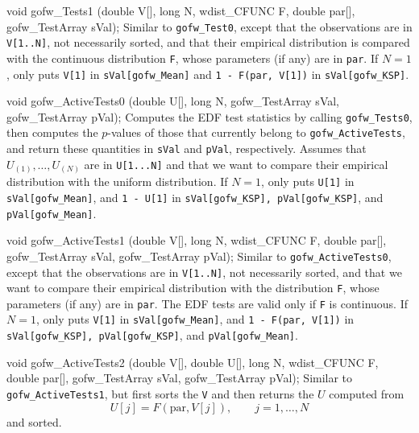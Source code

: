 void gofw_Tests1 (double V[], long N, wdist_CFUNC F, double par[],
                  gofw_TestArray sVal);
\endcode
\tab  Similar to {\tt gofw\_Test0}, except that 
 the observations are in {\tt V[1..N]},
 not necessarily sorted, and that their empirical
 distribution is compared with the continuous distribution {\tt F},
 whose parameters (if any) are in {\tt par}. 
 If $N = 1$, only puts {\tt V[1]} in {\tt sVal[gofw\_Mean]}
 and {\tt 1 - F(par, V[1])} in {\tt sVal[gofw\_KSP]}.
\endtab
\code


void gofw_ActiveTests0 (double U[], long N, 
                        gofw_TestArray sVal, gofw_TestArray pVal);
\endcode
\tab  Computes the EDF test statistics by calling 
  {\tt gofw\_Tests0}, then computes the $p$-values of those
  that currently belong to {\tt gofw\_ActiveTests},
  and return these quantities in {\tt sVal} and {\tt pVal}, respectively.
  Assumes that $U_{(1)},\dots,U_{(N)}$ are in {\tt U[1...N]}
  and that we want to compare their empirical distribution
  with the uniform distribution.
  If $N = 1$, only puts {\tt U[1]} in {\tt sVal[gofw\_Mean]},
  and {\tt 1 - U[1]} in {\tt sVal[gofw\_KSP], pVal[gofw\_KSP]}, and
  {\tt pVal[gofw\_Mean]}.
\endtab
\code


void gofw_ActiveTests1 (double V[], long N, wdist_CFUNC F, double par[],
                        gofw_TestArray sVal, gofw_TestArray pVal);
\endcode
\tab Similar to {\tt gofw\_ActiveTests0},
 except that the observations are in {\tt V[1..N]},
 not necessarily sorted, and that we want to compare their empirical
 distribution with the distribution {\tt F},
 whose parameters (if any) are in {\tt par}. 
 The EDF tests are valid only if {\tt F} is continuous.
 If $N = 1$, only puts {\tt V[1]} in {\tt sVal[gofw\_Mean]},
 and {\tt 1 - F(par, V[1])} in {\tt sVal[gofw\_KSP], pVal[gofw\_KSP]}, 
 and {\tt pVal[gofw\_Mean]}.
 \endtab
\code


void gofw_ActiveTests2 (double V[], double U[], long N, wdist_CFUNC F,
                        double par[], gofw_TestArray sVal,
                        gofw_TestArray pVal);
\endcode
\tab Similar to {\tt gofw\_ActiveTests1}, but first sorts the {\tt V}
 and then  returns the $U$   computed from
$$
   U[j] = F(\mbox{par}, V[j]), \qquad j=1,\ldots,N
$$
  and sorted.
 \endtab
\code


